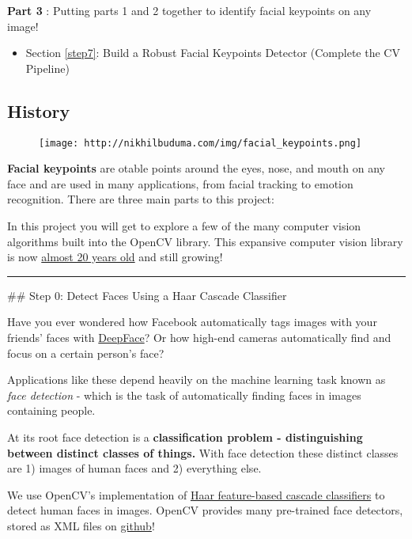 \documentclass[11pt]{article}
\makeatletter
\def\maxwidth{\ifdim\Gin@nat@width>\linewidth\linewidth
    \else\Gin@nat@width\fi}
\let\Oldincludegraphics\includegraphics
\renewcommand{\includegraphics}[1]{\Oldincludegraphics[width=.8\maxwidth]{#1}}
\providecommand{\tightlist}{%
      \setlength{\itemsep}{0pt}\setlength{\parskip}{0pt}}
\makeatother
\begin{document}
\textbf{Part 3} : Putting parts 1 and 2 together to identify facial
keypoints on any image!

\begin{itemize}
\tightlist
\item
  Section \ref{step7}: Build a Robust Facial Keypoints Detector
  (Complete the CV Pipeline)
\end{itemize}

    \subsection{History}\label{history}

\begin{figure}
\centering
\texttt{[image: http://nikhilbuduma.com/img/facial\_keypoints.png]}
\caption{}
\end{figure}

\textbf{Facial keypoints} are otable points around the eyes, nose, and
mouth on any face and are used in many applications, from facial
tracking to emotion recognition. There are three main parts to this
project:

In this project you will get to explore a few of the many computer
vision algorithms built into the OpenCV library. This expansive computer
vision library is now
\href{https://en.wikipedia.org/wiki/OpenCV\#History}{almost 20 years
old} and still growing!

    \begin{center}\rule{0.5\linewidth}{\linethickness}\end{center}

 \#\# Step 0: Detect Faces Using a Haar Cascade Classifier

Have you ever wondered how Facebook automatically tags images with your
friends' faces with
\href{https://research.fb.com/publications/deepface-closing-the-gap-to-human-level-performance-in-face-verification/}{DeepFace}?
Or how high-end cameras automatically find and focus on a certain
person's face?

Applications like these depend heavily on the machine learning task
known as \emph{face detection} - which is the task of automatically
finding faces in images containing people.

At its root face detection is a \textbf{classification problem -
distinguishing between distinct classes of things.} With face detection
these distinct classes are 1) images of human faces and 2) everything
else.

We use OpenCV's implementation of
\href{http://docs.opencv.org/trunk/d7/d8b/tutorial_py_face_detection.html}{Haar
feature-based cascade classifiers} to detect human faces in images.
OpenCV provides many pre-trained face detectors, stored as XML files on
\href{https://github.com/opencv/opencv/tree/master/data/haarcascades}{github}!
\end{document}
